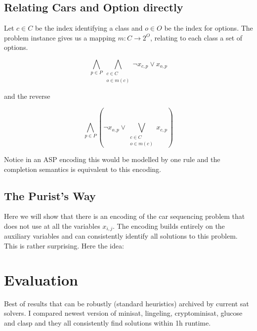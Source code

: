 \documentclass[]{llncs}
\begin{document}
\subsection{Relating Cars and Option directly}

Let $c \in C$ be the index identifying a class and $o\in O $ be the
index for options. The problem instance gives us a mapping $m :
C\rightarrow 2^O$, relating to each class a set of options. 

\begin{equation}
    \bigwedge_{p\in P} \bigwedge_{\substack{c \in C \\ o \in m(c)}}
    \neg x_{c,p} \vee x_{o,p}
\end{equation}

and the reverse

\begin{equation}
    \bigwedge_{p\in P} (\neg x_{o,p} \vee \bigvee_{\substack{c \in C \\
    o \in m(c)}} x_{c,p})
\end{equation}

Notice in an ASP encoding this would be modelled by one rule and the
completion semantics is equivalent to this encoding. 

\subsection{The Purist's Way}

Here we will show that there is an encoding of the car sequencing
problem that does not use at all the variables $x_{i,j}$. The encoding
builds entirely on the auxiliary variables and can consistently identify
all solutions to this problem. This is rather surprising. Here the idea: 

\section{Evaluation}

Best of results that can be robustly (standard heuristics) archived by
current sat solvers. I compared newest version of minisat, lingeling,
cryptominisat, glucose and clasp and they all consistently find
solutions within 1h runtime. 

\DTLsetseparator{,}

\begin{table}[htbp]
    \caption{}
    \centering
\end{table}
\end{document}
